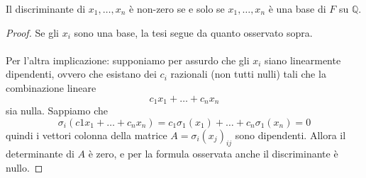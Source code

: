 \begin{proposizione}
	Il discriminante di $x_1,\dots,x_n$ è non-zero se e solo se $x_1,\dots,x_n$ è una base di $F$ su $\mathbb{Q}$.
\end{proposizione}
\begin{proof}
	Se gli $x_i$ sono una base, la tesi segue da quanto osservato sopra.
	\\ \\ Per l'altra implicazione: supponiamo per assurdo che gli $x_i$ siano linearmente dipendenti, ovvero che esistano dei $c_i$ razionali (non tutti nulli) tali che la combinazione lineare 
	\begin{equation*}
	c_1x_1+\dots+c_nx_n
	\end{equation*}
	sia nulla. Sappiamo che 
	\begin{equation*}
	\sigma_i\left(c1x_1+\dots+c_nx_n\right)
	=c_1\sigma_1(x_1)+\dots+c_n\sigma_1(x_n)=0
	\end{equation*}
	quindi i vettori colonna della matrice $A=\sigma_i(x_j)_{ij}$ sono dipendenti. Allora il determinante di $A$ è zero, e per la formula osservata anche il discriminante è nullo.
\end{proof}

